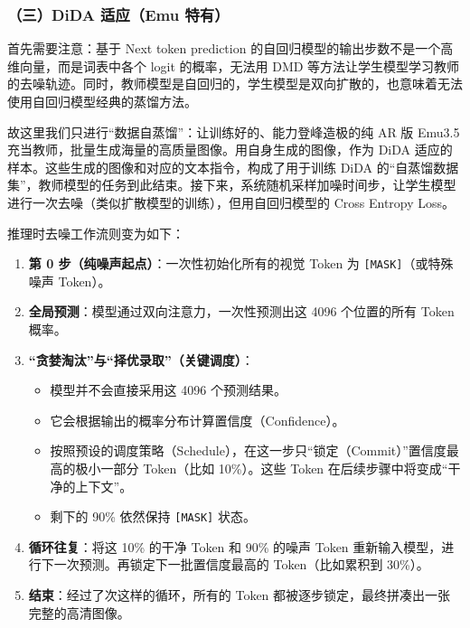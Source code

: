 \hypertarget{ux4e09dida-ux9002ux5e94emu-ux7279ux6709}{%
\subsubsection{（三）DiDA 适应（Emu 特有）}\label{ux4e09dida-ux9002ux5e94emu-ux7279ux6709}}

首先需要注意：基于 Next token prediction 的自回归模型的输出步数不是一个高维向量，而是词表中各个 logit 的概率，无法用 DMD 等方法让学生模型学习教师的去噪轨迹。同时，教师模型是自回归的，学生模型是双向扩散的，也意味着无法使用自回归模型经典的蒸馏方法。

故这里我们只进行``数据自蒸馏''：让训练好的、能力登峰造极的纯 AR 版 Emu3.5 充当教师，批量生成海量的高质量图像。用自身生成的图像，作为 DiDA 适应的样本。这些生成的图像和对应的文本指令，构成了用于训练 DiDA 的``自蒸馏数据集''，教师模型的任务到此结束。接下来，系统随机采样加噪时间步，让学生模型进行一次去噪（类似扩散模型的训练），但用自回归模型的 Cross Entropy Loss。

推理时去噪工作流则变为如下：

\begin{enumerate}
\def\labelenumi{\arabic{enumi}.}
\tightlist
\item
  \textbf{第 0 步（纯噪声起点）}：一次性初始化所有的视觉 Token 为 \texttt{{[}MASK{]}}（或特殊噪声 Token）。
\item
  \textbf{全局预测}：模型通过双向注意力，一次性预测出这 4096 个位置的所有 Token 概率。
\item
  \textbf{``贪婪淘汰''与``择优录取''（关键调度）}：

  \begin{itemize}
  \tightlist
  \item
    模型并不会直接采用这 4096 个预测结果。
  \item
    它会根据输出的概率分布计算置信度（Confidence）。
  \item
    按照预设的调度策略（Schedule），在这一步只``锁定（Commit）''置信度最高的极小一部分 Token（比如 10\%）。这些 Token 在后续步骤中将变成``干净的上下文''。
  \item
    剩下的 90\% 依然保持 \texttt{{[}MASK{]}} 状态。
  \end{itemize}
\item
  \textbf{循环往复}：将这 10\% 的干净 Token 和 90\% 的噪声 Token 重新输入模型，进行下一次预测。再锁定下一批置信度最高的 Token（比如累积到 30\%）。
\item
  \textbf{结束}：经过了次这样的循环，所有的 Token 都被逐步锁定，最终拼凑出一张完整的高清图像。
\end{enumerate}

